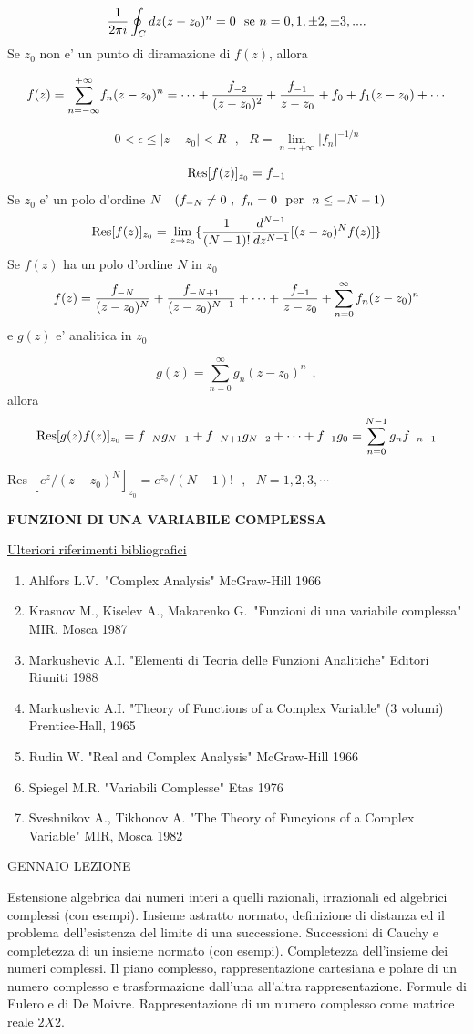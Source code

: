 \documentclass[,12pt]{article}
\begin{document}
$${1\over 2\pi i} \oint_C dz (z-z_0)^n =0  \mbox{\ \  se $ n =0,1,
\pm 2,
  \pm 3,....$}$$
\noindent
Se $z_0$ non e' un punto di diramazione di $f(z)$, allora

$$f(z) = {\sum^{+\infty}_{n= - \infty}} f_n (z-z_0)^n = \cdots + {f_{-2}\over
(z-z_0)^2} + {f_{-1}\over z - z_0} + f_0 + f_1 (z-z_0) + \cdots$$

$$0 < \epsilon \leq \vert z - z_0 \vert < R ~~~,~~~ R= \lim_{n\rightarrow +
\infty} \vert f_n \vert^{-1/n}$$

$${\rm Res} [f(z)]_{z_0} = f_{-1}$$
Se $z_0$ e' un polo d'ordine $N~~~  (f_{-N} \neq 0~,~  f_n = 0~~
  {\rm per}~~ n\leq - N - 1)$
$${\rm Res} [f(z)]_{z_0} = \lim_{z\rightarrow z_0} \{{1\over (N-1)!}
{d^{N-1}\over d z^{N-1}} [(z-z_0)^N  f(z)]\}$$
Se $f(z)$ ha un polo d'ordine $N$ in $z_0$
$$f(z) = {f_{-N}\over (z-z_0)^N} + {f_{-N+1}\over (z-z_0)^{N-1}}+ \cdots
+ {f_{-1}\over z -z_{0}} + \sum^\infty _{n=0} f_n (z-z_0)^n$$
e $g(z)$ e' analitica in $z_0$

$$g(z) =  \sum^\infty _{n=0} g_n (z-z_0)^n~~,$$   allora
$${\rm Res}[g(z) f(z)]_{z_0} =  f_{-N} g_{N-1} + f_{-N + 1} g_{N-2} + \cdots
  + f_{-1}  g_0 = \sum^{N-1}_{n=0} g_n f_{-n-1}$$

Res $[{e^z/{(z-z_0)^N}}]_{z_0} = {e^{z_0}/(N-1)!}~~~, 
~~~ N=1,2,3,\cdots$

\newpage
\centerline{\bf FUNZIONI DI UNA VARIABILE COMPLESSA}
\vskip 12pt
\noindent
\underline{Ulteriori riferimenti bibliografici}
\begin{enumerate}
\item Ahlfors L.V.\ "Complex Analysis" McGraw-Hill 1966
\item Krasnov M., Kiselev A., Makarenko G.\ "Funzioni di una variabile
complessa" MIR, Mosca 1987
\item Markushevic A.I. "Elementi di Teoria delle Funzioni Analitiche"
Editori Riuniti 1988
\item Markushevic A.I. "Theory of Functions of a Complex Variable"
(3 volumi) Prentice-Hall, 1965
\item Rudin W. "Real and Complex Analysis" McGraw-Hill 1966
\item Spiegel M.R. "Variabili Complesse" Etas 1976
\item Sveshnikov A., Tikhonov A. "The Theory of Funcyions of a
Complex Variable" MIR, Mosca 1982
\end{enumerate}
\vskip 12pt

 GENNAIO
\hskip 20pt
LEZIONE

\noindent
Estensione algebrica dai numeri interi a quelli razionali,
irrazionali ed algebrici complessi (con esempi). Insieme astratto
normato, definizione di distanza ed il problema dell'esistenza del
limite di una successione. Successioni di Cauchy e completezza di
un insieme normato (con esempi). Completezza dell'insieme dei numeri
complessi. Il piano complesso, rappresentazione cartesiana e polare
di un numero complesso e trasformazione dall'una all'altra
rappresentazione. Formule di Eulero e di De Moivre. Rappresentazione di
un numero complesso come matrice reale $2X2$.
\end{document}
